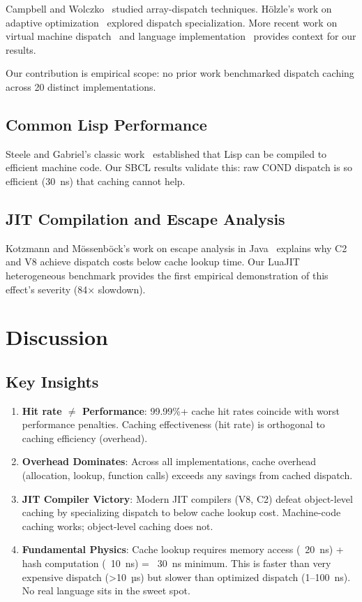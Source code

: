 \documentclass[sigplan,final]{acmart}
\begin{document}
Campbell and Wolczko~\cite{campbell1992array} studied array-dispatch techniques. Hölzle's work
on adaptive optimization~\cite{hoelzle1994adaptive} explored dispatch specialization. More recent
work on virtual machine dispatch~\cite{ahn2014fast} and language implementation~\cite{tobin2017performance}
provides context for our results.

Our contribution is empirical scope: no prior work benchmarked dispatch caching across 20
distinct implementations.

\subsection{Common Lisp Performance}

Steele and Gabriel's classic work~\cite{steele1990lisp} established that Lisp can be compiled
to efficient machine code. Our SBCL results validate this: raw COND dispatch is so efficient
(30~ns) that caching cannot help.

\subsection{JIT Compilation and Escape Analysis}

Kotzmann and Mössenböck's work on escape analysis in Java~\cite{kotzmann2005escape} explains
why C2 and V8 achieve dispatch costs below cache lookup time. Our LuaJIT heterogeneous benchmark
provides the first empirical demonstration of this effect's severity (84× slowdown).

\section{Discussion}

\subsection{Key Insights}

\begin{enumerate}
  \item \textbf{Hit rate $\neq$ Performance}: 99.99\%+ cache hit rates coincide with worst performance
    penalties. Caching effectiveness (hit rate) is orthogonal to caching efficiency (overhead).

  \item \textbf{Overhead Dominates}: Across all implementations, cache overhead (allocation, lookup,
    function calls) exceeds any savings from cached dispatch.

  \item \textbf{JIT Compiler Victory}: Modern JIT compilers (V8, C2) defeat object-level caching by
    specializing dispatch to below cache lookup cost. Machine-code caching works; object-level
    caching does not.

  \item \textbf{Fundamental Physics}: Cache lookup requires memory access (~20~ns) + hash computation
    (~10~ns) = ~30~ns minimum. This is faster than very expensive dispatch (>10~µs) but slower than
    optimized dispatch (1--100~ns). No real language sits in the sweet spot.
\end{enumerate}
\end{document}
